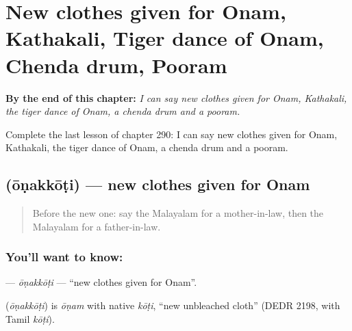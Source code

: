 
\chapter{New clothes given for Onam, Kathakali, Tiger dance of Onam, Chenda drum, Pooram}
\label{ch:ml-new-clothes-given-for-onam-kathakali-tiger-dance-of-onam-chenda-drum-pooram}

\begin{chapteropening}
\textbf{By the end of this chapter:} \emph{I can say new clothes given for Onam, Kathakali, the tiger dance of Onam, a chenda drum and a pooram.}

Complete the last lesson of chapter 290: I can say new clothes given for Onam, Kathakali, the tiger dance of Onam, a chenda drum and a pooram.
\end{chapteropening}

\section[\texorpdfstring{\ml{ഓണക്കോടി} (ōṇakkōṭi)}{ഓണക്കോടി (ōṇakkōṭi)}]{ (ōṇakkōṭi) — new clothes given for Onam}

\label{lesson:ML-C290-onakkoti}



\begin{quote}
Before the new one: say the Malayalam for a mother-in-law, then the Malayalam for a father-in-law.
\end{quote}

\subsection*{You'll want to know: }
\textbf{} — \emph{ōṇakkōṭi} — \textquotedblleft{}new clothes given for Onam\textquotedblright{}.

\begin{cousinweb}
\textbf{} (\emph{ōṇakkōṭi}) is \emph{ōṇam} with native \emph{kōṭi}, \textquotedblleft{}new unbleached cloth\textquotedblright{} (DEDR 2198, with Tamil \emph{kōṭi}).
\end{cousinweb}

